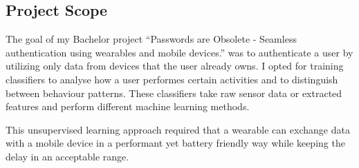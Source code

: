 \subsection{Project Scope}
The goal of my Bachelor project ``Passwords are Obsolete - Seamless authentication using wearables and mobile devices.'' was to authenticate a user by utilizing only data from devices that the user already owns. I opted for training classifiers to analyse how a user performes certain activities and to distinguish between behaviour patterns. These classifiers take raw sensor data or extracted features and perform different machine learning methods.

This unsupervised learning approach required that a wearable can exchange data with a mobile device in a performant yet battery friendly way while keeping the delay in an acceptable range.


\clearpage